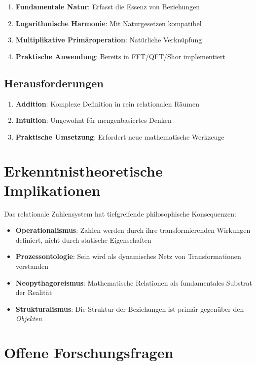 	\begin{enumerate}
		\item \textbf{Fundamentale Natur}: Erfasst die Essenz von Beziehungen
		\item \textbf{Logarithmische Harmonie}: Mit Naturgesetzen kompatibel
		\item \textbf{Multiplikative Primäroperation}: Natürliche Verknüpfung
		\item \textbf{Praktische Anwendung}: Bereits in FFT/QFT/Shor implementiert
	\end{enumerate}
	
	\subsection{Herausforderungen}
	
	\begin{enumerate}
		\item \textbf{Addition}: Komplexe Definition in rein relationalen Räumen
		\item \textbf{Intuition}: Ungewohnt für mengenbasiertes Denken
		\item \textbf{Praktische Umsetzung}: Erfordert neue mathematische Werkzeuge
	\end{enumerate}
	
	\section{Erkenntnistheoretische Implikationen}
	
	Das relationale Zahlensystem hat tiefgreifende philosophische Konsequenzen:
	
	\begin{itemize}
		\item \textbf{Operationalismus}: Zahlen werden durch ihre transformierenden Wirkungen definiert, nicht durch statische Eigenschaften
		\item \textbf{Prozessontologie}: Sein wird als dynamisches Netz von Transformationen verstanden
		\item \textbf{Neopythagoreismus}: Mathematische Relationen als fundamentales Substrat der Realität
		\item \textbf{Strukturalismus}: Die Struktur der Beziehungen ist primär gegenüber den \emph{Objekten}
	\end{itemize}
	
	\section{Offene Forschungsfragen}
	
